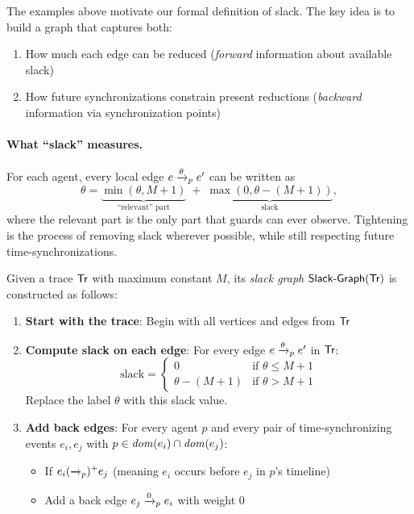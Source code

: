The examples above motivate our formal definition of slack. The key idea is to build a graph that captures both:
\begin{enumerate}
\item How much each edge can be reduced (\emph{forward} information about available slack)
\item How future synchronizations constrain present reductions (\emph{backward} information via synchronization points)
\end{enumerate}

\paragraph*{What ``slack'' measures.}
For each agent, every local edge $e \xrightarrow{\theta}_p e'$ can be written as
\[
\theta = \underbrace{\min(\theta, M{+}1)}_{\text{``relevant'' part}} \;+\;
\underbrace{\max(0,\theta-(M{+}1))}_{\text{slack}},
\]
where the relevant part is the only part that guards can ever observe.
Tightening is the process of removing slack wherever possible, while still respecting future time-synchronizations.

\begin{definition}
Given a trace $\textsf{Tr}$ with maximum constant $M$, its \emph{slack graph} $\mathrm{\textsf{Slack-Graph}}(\textsf{Tr})$ is constructed as follows:

\begin{enumerate}
\item \textbf{Start with the trace}: Begin with all vertices and edges from $\textsf{Tr}$

\item \textbf{Compute slack on each edge}: For every edge $e \xrightarrow{\theta}_p e'$ in $\textsf{Tr}$:
  \[
  \text{slack} = \begin{cases}
    0 & \text{if } \theta \leq M+1 \\
    \theta - (M+1) & \text{if } \theta > M+1
  \end{cases}
  \]
  Replace the label $\theta$ with this slack value.

\item \textbf{Add back edges}: For every agent $p$ and every pair of time-synchronizing events $e_i, e_j$ with $p \in \mathit{dom}(e_i) \cap \mathit{dom}(e_j)$:
  \begin{itemize}
  \item If $e_i (\xrightarrow{}_p)^+ e_j$ (meaning $e_i$ occurs before $e_j$ in $p$'s timeline)
  \item Add a back edge $e_j \xrightarrow{0}_p e_i$ with weight 0
  \end{itemize}
\end{enumerate}
\end{definition}

